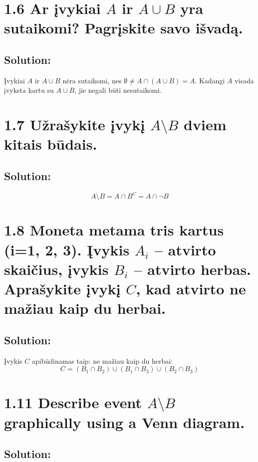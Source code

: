 \documentclass{article}
\begin{document}
\section*{1.6 Ar įvykiai \(A\) ir \(A \cup B\) yra sutaikomi? Pagrįskite savo išvadą.}

\subsection*{Solution:}
Įvykiai \(A\) ir \(A \cup B\) nėra sutaikomi, nes \(\emptyset \ne A \cap (A \cup B) = A\). Kadangi \(A\) visada įvyksta kartu su \(A \cup B\), jie negali būti nesutaikomi.

\section*{1.7 Užrašykite įvykį \(A \setminus B\) dviem kitais būdais.}

\subsection*{Solution:}
\[
A \setminus B = A \cap B^C = A \cap \neg B
\]

\section*{1.8 Moneta metama tris kartus (i=1, 2, 3). Įvykis \(A_i\) – atvirto skaičius, įvykis \(B_i\) – atvirto herbas. Aprašykite įvykį \(C\), kad atvirto ne mažiau kaip du herbai.}

\subsection*{Solution:}
Įvykis \(C\) apibūdinamas taip: ne mažiau kaip du herbai:
\[
C = (B_1 \cap B_2) \cup (B_1 \cap B_3) \cup (B_2 \cap B_3)
\]

\section*{1.11 Describe event \(A \setminus B\) graphically using a Venn diagram.}

\subsection*{Solution:}
\begin{center}
\end{center}
\end{document}
